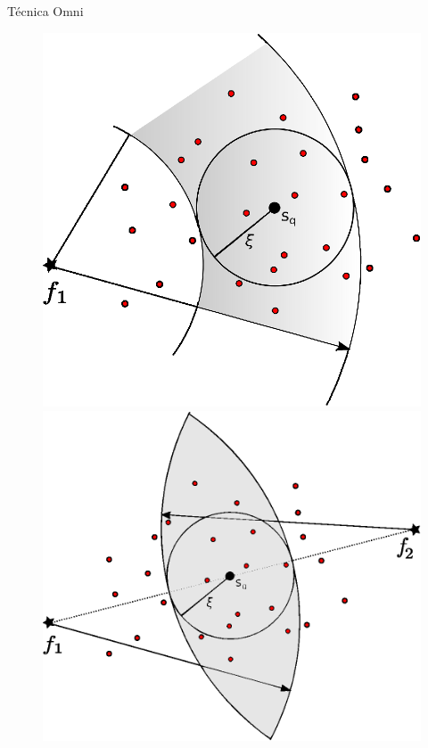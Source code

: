\documentclass{beamer}
\begin{document}
\begin{frame}{Técnica Omni}

	\begin{figure}
	    \centering
	    \begin{minipage}{.5\textwidth}
	      \centering
	      \includegraphics[width=.9\linewidth]{rg_omni_1.eps}


	    \end{minipage}%
	    \begin{minipage}{.5\textwidth}
	      \centering
	      \includegraphics[width=.95\linewidth]{rg_omni_2.eps}


	    \end{minipage}
	\end{figure}
 
\end{frame}
\end{document}
